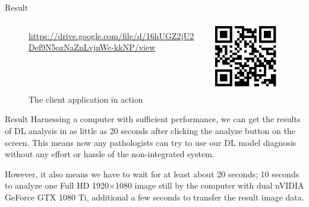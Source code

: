 \documentclass[
  dvipdfmx,
  xcolor={svgnames},
  hyperref={colorlinks,citecolor=DeepPink4,linkcolor=DarkRed,urlcolor=DarkBlue}
  ]{beamer}
\begin{document}
\begin{frame}{Result}
\begin{figure}[t]
    \begin{columns}[]
      \begin{column}{0.80\columnwidth}
        \tiny \href{https://drive.google.com/file/d/16hUGZ2jU2Def9N5ozNaZnLvjnWc-kkNP/view}{https://drive.google.com/file/d/16hUGZ2jU2Def9N5ozNaZnLvjnWc-kkNP/view}
        \caption{The client application in action}
        \label{fig:in_action}
      \end{column}
      \begin{column}{0.18\columnwidth}
        \includegraphics[width=\columnwidth, keepaspectratio]{assets/qr.png}
      \end{column}
    \end{columns}
  \end{figure}
\end{frame}

\begin{frame}{Result}
  Harnessing a computer with sufficient performance, we can get the results of DL analysis in as little as 20 seconds after clicking the analyze button on the screen. This means now any pathologists can try to use our DL model diagnosis without any effort or hassle of the non-integrated system.
  \par
  \vspace{0.5zh}
  However, it also means we have to wait for at least about 20 seconds; 10 seconds to analyze one Full HD 1920×1080 image still by the computer with dual nVIDIA GeForce GTX 1080 Ti, additional a few seconds to transfer the result image data.
\end{frame}
\end{document}
